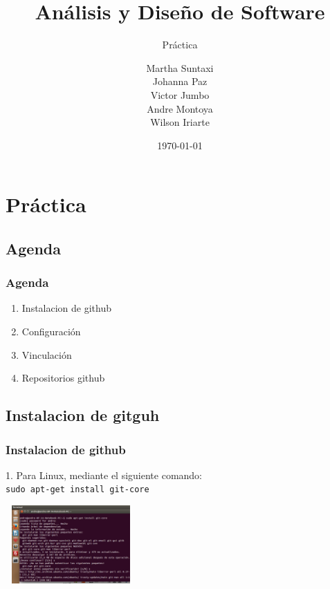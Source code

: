 \documentclass{beamer}
\title{Análisis y Diseño de Software}
\subtitle{Práctica}
\author[Grupo1]{
Martha Suntaxi\\Johanna Paz\\Victor Jumbo\\Andre Montoya\\Wilson Iriarte
}
\date{\today}
\institute{Ingeniería en Sistemas\\}
\begin{document}
	
	\begin{frame}[plain,t]
		\titlepage
	\end{frame}

	\section{Práctica}

\subsection{Agenda}
\begin{frame}
\frametitle{Agenda}
{\small
\begin{enumerate}
	\item Instalacion de github
	\item Configuración
	\item Vinculación
	\item Repositorios github
\end{enumerate}
}
\end{frame}
\subsection{Instalacion de gitguh}
		\begin{frame}
			\frametitle{Instalacion de github}
			1. Para Linux, mediante el siguiente comando:\\
			{\tt \scriptsize sudo apt-get install git-core}\\
			\begin{center}\includegraphics[width=5cm, height=3cm]{1.png}\end{center}
		\end{frame}
		
\end{document}
